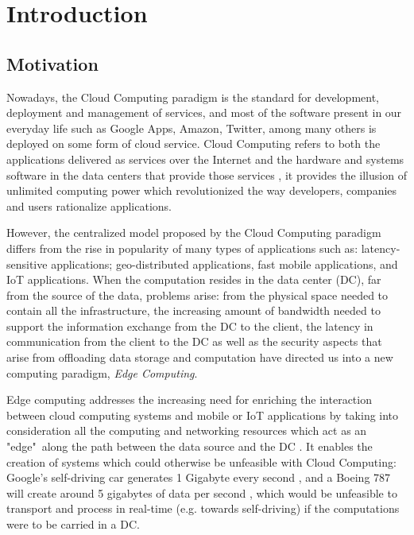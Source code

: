 \newcommand{\novathesis}{\emph{novathesis}}
\newcommand{\novathesisclass}{\texttt{novathesis.cls}}

\chapter{Introduction}
\label{cha:introduction}

\section{Motivation}

Nowadays, the Cloud Computing paradigm is the standard for development, deployment and management of services, and most of the software present in our everyday life such as Google Apps, Amazon, Twitter, among many others is deployed on some form of cloud service. Cloud Computing refers to both the applications delivered as services over the Internet and the hardware and systems software in the data centers that provide those services \cite{10.1145/1721654.1721672}, it provides the illusion of unlimited computing power which revolutionized the way developers, companies and users rationalize applications.

However, the centralized model proposed by the Cloud Computing paradigm differs from the rise in popularity of many types of applications \cite{10.1145/3154815} such as: latency-sensitive applications; geo-distributed applications, fast mobile applications, and IoT applications. When the computation resides in the data center (DC), far from the source of the data, problems arise: from the physical space needed to contain all the infrastructure, the increasing amount of bandwidth needed to support the information exchange from the DC to the client, the latency in communication from the client to the DC as well as the security aspects that arise from offloading data storage and computation have directed us into a new computing paradigm, \textit{Edge Computing}.

Edge computing addresses the increasing need for enriching the interaction between cloud computing systems and mobile or IoT applications by taking into consideration all the computing and networking resources which act as an "edge"\ along the path between the data source and the DC \cite{Leitao2018} \cite{7488250}. It enables the creation of systems which could otherwise be unfeasible with Cloud Computing: Google's self-driving car generates 1 Gigabyte every second \cite{datafloq}, and a Boeing 787 will create around 5 gigabytes of data per second \cite{finnegan_2013}, which would be unfeasible to transport and process in real-time (e.g. towards self-driving) if the computations were to be carried in a DC. 

